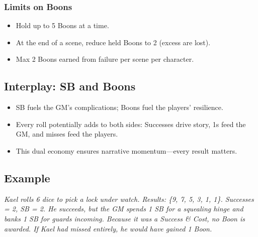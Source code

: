 \subsubsection{Limits on Boons}
\begin{itemize}
  \item Hold up to 5 Boons at a time.
  \item At the end of a scene, reduce held Boons to 2 (excess are lost).
  \item Max 2 Boons earned from failure per scene per character.
\end{itemize}

\subsection{Interplay: SB and Boons}
\begin{itemize}
  \item SB fuels the GM’s complications; Boons fuel the players’ resilience.
  \item Every roll potentially adds to both sides: Successes drive story, 1s feed the GM, and misses feed the players.
  \item This dual economy ensures narrative momentum—every result matters.
\end{itemize}

\subsection{Example}
\emph{Kael rolls 6 dice to pick a lock under watch. Results: \{9, 7, 5, 3, 1, 1\}. Successes = 2, SB = 2. He succeeds, but the GM spends 1 SB for a squealing hinge and banks 1 SB for guards incoming. Because it was a Success \& Cost, no Boon is awarded. If Kael had missed entirely, he would have gained 1 Boon.}
